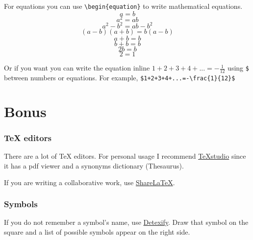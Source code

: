 \documentclass[a4paper,12pt]{article}
\begin{document}
For equations you can use \verb|\begin{equation}| to write mathematical equations.
\begin{equation}
	a = b
\end{equation}
\begin{equation}
	a^2=ab
\end{equation}
\begin{equation}
	a^2-b^2=ab-b^2
\end{equation}
\begin{equation}
	(a-b)(a+b)=b(a-b)
\end{equation}
\begin{equation}
	a+b=b
\end{equation}
\begin{equation}
	b+b=b
\end{equation}
\begin{equation}
	2b=b
\end{equation}
\begin{equation}
	2=1
\end{equation}



Or if you want you can write the equation inline $1+2+3+4+...=-\frac{1}{12}$ using \verb|$| between numbers or equations. For example, \verb|$1+2+3+4+...=-\frac{1}{12}$|

\section{Bonus}
\subsubsection{TeX editors}

There are a lot of TeX editors. For personal usage I recommend \href{http://texstudio.sourceforge.net/}{TeXstudio} since it has a pdf viewer and a synonyms dictionary (Thesaurus).

If you are writing a collaborative work, use \href{https://www.sharelatex.com/}{ShareLaTeX}.

\subsubsection{Symbols}
If you do not remember a symbol's name, use \href{http://detexify.kirelabs.org/classify.html}{Detexify}. Draw that symbol on the square and a list of possible symbols appear on the right side.
\end{document}
